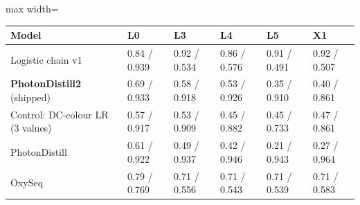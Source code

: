 {\footnotesize
\setlength{\tabcolsep}{4pt}
\begin{adjustbox}{max width=\linewidth}
\begin{tabular}{p{3.8cm}lllll}
\toprule
Model & L0 & L3 & L4 & L5 & X1 \\
\midrule
Logistic chain v1 & 0.84 / 0.939 & 0.92 / 0.534 & 0.86 / 0.576 & 0.91 / 0.491 & 0.92 / 0.507 \\
\textbf{PhotonDistill2} (shipped) & 0.69 / 0.933 & 0.58 / 0.918 & 0.53 / 0.926 & 0.35 / 0.910 & 0.40 / 0.861 \\
Control: DC-colour LR (3 values) & 0.57 / 0.917 & 0.53 / 0.909 & 0.45 / 0.882 & 0.45 / 0.733 & 0.47 / 0.861 \\
PhotonDistill & 0.61 / 0.922 & 0.49 / 0.937 & 0.42 / 0.946 & 0.21 / 0.943 & 0.27 / 0.964 \\
OxySeq & 0.79 / 0.769 & 0.71 / 0.556 & 0.71 / 0.543 & 0.71 / 0.539 & 0.71 / 0.583 \\
\bottomrule
\end{tabular}
\end{adjustbox}
}
